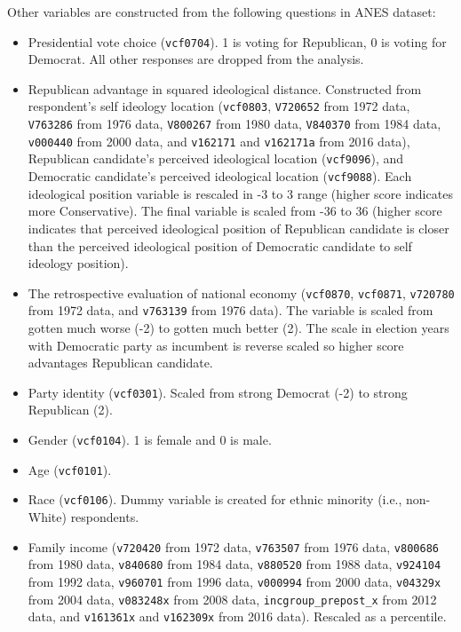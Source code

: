 \par Other variables are constructed from the following questions in ANES dataset:

\begin{itemize}
    \item Presidential vote choice (\texttt{vcf0704}). 1 is voting for Republican, 0 is voting for Democrat. All other responses are dropped from the analysis.
    \item Republican advantage in squared ideological distance. Constructed from respondent's self ideology location (\texttt{vcf0803}, \texttt{V720652} from 1972 data, \texttt{V763286} from 1976 data, \texttt{V800267} from 1980 data, \texttt{V840370} from 1984 data, \texttt{v000440} from 2000 data, and \texttt{v162171} and \texttt{v162171a} from 2016 data), Republican candidate's perceived ideological location (\texttt{vcf9096}), and Democratic candidate's perceived ideological location (\texttt{vcf9088}). Each ideological position variable is rescaled in -3 to 3 range (higher score indicates more Conservative). The final variable is scaled from -36 to 36 (higher score indicates that perceived ideological position of Republican candidate is closer than the perceived ideological position of Democratic candidate to self ideology position).
    \item The retrospective evaluation of national economy (\texttt{vcf0870}, \texttt{vcf0871}, \texttt{v720780} from 1972 data, and \texttt{v763139} from 1976 data). The variable is scaled from gotten much worse (-2) to gotten much better (2). The scale in election years with Democratic party as incumbent is reverse scaled so higher score advantages Republican candidate. 
    \item Party identity (\texttt{vcf0301}). Scaled from strong Democrat (-2) to strong Republican (2).
    \item Gender (\texttt{vcf0104}). 1 is female and 0 is male.
    \item Age (\texttt{vcf0101}).
    \item Race (\texttt{vcf0106}). Dummy variable is created for ethnic minority (i.e., non-White) respondents.
    \item Family income (\texttt{v720420} from 1972 data, \texttt{v763507} from 1976 data, \texttt{v800686} from 1980 data, \texttt{v840680} from 1984 data, \texttt{v880520} from 1988 data, \texttt{v924104} from 1992 data, \texttt{v960701} from 1996 data, \texttt{v000994} from 2000 data, \texttt{v04329x} from 2004 data, \texttt{v083248x} from 2008 data, \texttt{incgroup\_prepost\_x} from 2012 data, and \texttt{v161361x} and \texttt{v162309x} from 2016 data). Rescaled as a percentile.

\end{itemize}

